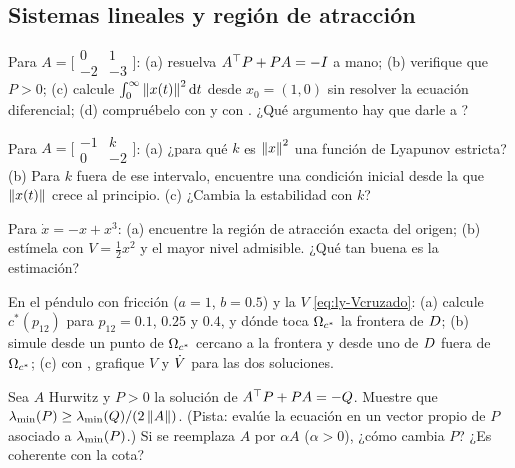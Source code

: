 \subsection*{Sistemas lineales y región de atracción}

\begin{problema}\label{prob:ly-mano}
Para $A=\bigl[\begin{smallmatrix}0&1\\-2&-3\end{smallmatrix}\bigr]$: (a) resuelva $A^{\top} P+PA=-I$ a mano; (b) verifique que $P>0$; (c) calcule $\int_0^\infty\left\lVert x(t)\right\rVert^2\mathrm{d} t$ desde $x_0=(1,0)$ sin resolver la ecuación diferencial; (d) \etiquetaM{} compruébelo con  y con . ¿Qué argumento hay que darle a ?
\end{problema}

\begin{problema}\label{prob:ly-norma}
Para $A=\bigl[\begin{smallmatrix}-1&k\\0&-2\end{smallmatrix}\bigr]$: (a) ¿para qué $k$ es $\left\lVert x\right\rVert^2$ una función de Lyapunov estricta? (b) Para $k$ fuera de ese intervalo, encuentre una condición inicial desde la que $\left\lVert x(t)\right\rVert$ crece al principio. (c) ¿Cambia la estabilidad con $k$?
\end{problema}

\begin{problema}\label{prob:ly-unidim}
Para $\dot x=-x+x^3$: (a) encuentre la región de atracción exacta del origen; (b) estímela con $V=\tfrac12x^2$ y el mayor nivel admisible. ¿Qué tan buena es la estimación?
\end{problema}

\begin{problema}\label{prob:ly-tangencia}
\etiquetaM{} En el péndulo con fricción ($a=1$, $b=0.5$) y la $V$ \eqref{eq:ly-Vcruzado}: (a) calcule $c^*(p_{12})$ para $p_{12}=0.1$, $0.25$ y $0.4$, y dónde toca $\Omega_{c^*}$ la frontera de $D$; (b) simule desde un punto de $\Omega_{c^*}$ cercano a la frontera y desde uno de $D$ fuera de $\Omega_{c^*}$; (c) con , grafique $V$ y $\dot V$ para las dos soluciones.
\end{problema}

\begin{problema}\label{prob:ly-cota}
\etiquetaEstrella{} Sea $A$ Hurwitz y $P>0$ la solución de $A^{\top} P+PA=-Q$. Muestre que $\lambda_{\min}(P)\ge\lambda_{\min}(Q)/(2\left\lVert A\right\rVert)$. (Pista: evalúe la ecuación en un vector propio de $P$ asociado a $\lambda_{\min}(P)$.) Si se reemplaza $A$ por $\alpha A$ ($\alpha>0$), ¿cómo cambia $P$? ¿Es coherente con la cota?
\end{problema}

